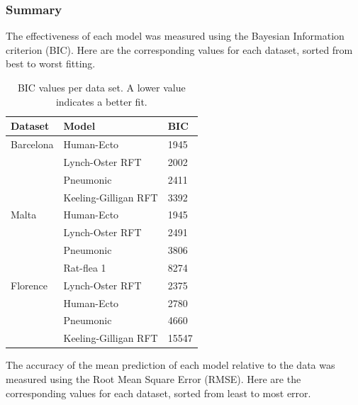 \documentclass [letterpaper, 12pt] {article}
\begin{document}
\newpage


\subsubsection{Summary}

The effectiveness of each model was measured using the Bayesian Information criterion (BIC). Here are the corresponding values for each dataset, sorted from best to worst fitting.

\begin{table}[H]
	\begin{center}
		\begin{tabular}{|l|l|l|}
			\hline
			\textbf{Dataset} & \textbf{Model}       & \textbf{BIC} \\ \hline
			Barcelona        & Human-Ecto           & 1945         \\ \cline{2-3}
			                 & Lynch-Oster RFT      & 2002         \\ \cline{2-3}
			                 & Pneumonic            & 2411         \\ \cline{2-3}
			                 & Keeling-Gilligan RFT & 3392         \\ \hline
			Malta            & Human-Ecto           & 1945         \\ \cline{2-3}
			                 & Lynch-Oster RFT      & 2491         \\ \cline{2-3}
			                 & Pneumonic            & 3806         \\ \cline{2-3}
			                 & Rat-flea 1           & 8274         \\ \hline
			Florence         & Lynch-Oster RFT      & 2375         \\ \cline{2-3}
			                 & Human-Ecto           & 2780         \\ \cline{2-3}
			                 & Pneumonic            & 4660         \\ \cline{2-3}
			                 & Keeling-Gilligan RFT & 15547        \\ \hline
		\end{tabular}
	\end{center}
	\caption{BIC values per data set. A lower value indicates a better fit.}
\end{table}

The accuracy of the mean prediction of each model relative to the data was measured using the Root Mean Square Error (RMSE). Here are the corresponding values for each dataset, sorted from least to most error.
\end{document}
